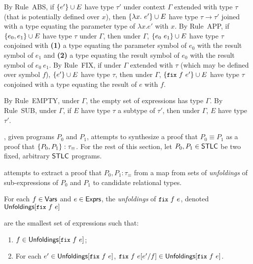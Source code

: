 By Rule~ABS, if $\{  e'  \} \cup  E $ have type $\tau'$ under context
$\Gamma$ extended with type $\tau$ (that is potentially defined over
$x$), then $\{  \lambda x.\ e'  \} \cup  E $ have type $\tau \rightarrow
\tau'$ joined with a type equating the parameter type of $\lambda
x. e'$ with $x$.
By Rule~APP, if $\{  e_0, e_1  \} \cup E$ have type $\tau$ under
$\Gamma$, then under $\Gamma$, $\{  e_0\ e_1  \} \cup  E $ have type
$\tau$ conjoined with %
\textbf{(1)} a type equating the parameter symbol of $e_0$ with the
result symbol of $e_1$ and %
\textbf{(2)} a type equating the result symbol of $e_0$ with the
result symbol of $e_0\ e_1$.
By Rule~FIX, if under $\Gamma$ extended with $\tau$ (which may be
defined over symbol $f$), $\{  e'  \} \cup  E $ have type $\tau$, then
under $\Gamma$, $\add{ \fix{ f }{ e' } }{ E }$ have type $\tau$
conjoined with a type equating the result of $e$ with $f$.

By Rule~EMPTY, under $\Gamma$, the empty set of expressions has type
$\Gamma$.
%
By Rule~SUB, under $\Gamma$, if $E$ have type $\tau$ a subtype of
$\tau'$, then under $\Gamma$, $E$ have type $\tau'$.

% 
\sys, given programs $P_0$ and $P_1$, attempts to synthesize a proof
that $P_0 \equiv P_1$ as a proof that $\{  P_0, P_1  \} :
\tau_{\equiv}$.
%
For the rest of this section, let $P_0, P_1 \in \mathsf{STLC}$ be two fixed,
arbitrary $\mathsf{STLC}$ programs.

\sys attempts to extract a proof that $P_0, P_1 : \tau_{\equiv}$ from
a map from sets of \emph{unfoldings} of sub-expressions of $P_0$
and $P_1$ to candidate relational types.
%
\begin{defn}
  \label{defn:unfoldings}
  For each $f \in \mathsf{Vars}$ and $e \in \mathsf{Exprs}$, the \emph{unfoldings} of
  $\fix{f}{e}$, denoted $\unfoldings{ \fix{f}{e} }$

 are the smallest set of expressions such that:
  \begin{enumerate}
  \item $f \in \unfoldings{ \fix{f}{e} }$;
  \item For each $e' \in \unfoldings{ \fix{f}{e} }$, $\replace{
      \fix{f}{e} }{ f }{ e' } \in \unfoldings{ \fix{f}{e} }$.
  \end{enumerate}
\end{defn}
%
%

